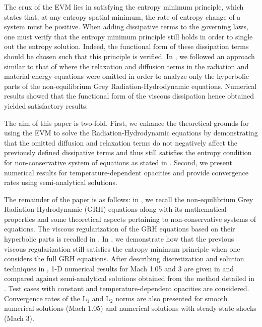 \documentclass[times]{fldauth}
\begin{document}
The crux of the EVM lies in satisfying the entropy minimum principle, which states that, at any entropy spatial 
minimum, the rate of entropy change of a system must be positive. When
adding dissipative terms to the governing laws, one must verify that the entropy minimum principle still holds in 
order to single out the entropy solution. Indeed, the functional form of these dissipation terms
should be chosen such that this principle is verified. In \cite{our_jcp_radhy_paper}, we followed an approach 
similar to that of \cite{Balsara, LowrieMorel} 
where the relaxation and diffusion terms in the radiation and material energy equations were omitted in order to 
analyze only the hyperbolic parts of 
the non-equilibrium Grey Radiation-Hydrodynamic equations. Numerical results showed that the functional form of the 
viscous dissipation hence obtained yielded satisfactory results. 

The aim of this paper is two-fold. First, we enhance the theoretical grounds for using the EVM to solve the 
Radiation-Hydrodynamic equations by demonstrating that the omitted diffusion
and relaxation terms do not negatively affect the previously defined dissipative terms and thus still satisfies the 
entropy condition for non-conservative system of equations as stated in \cite{our_jcp_radhy_paper}. Second, we present numerical
results for temperature-dependent opacities and provide convergence rates using semi-analytical solutions.

The remainder of the paper is as follows: in , we recall
the non-equilibrium Grey Radiation-Hydrodynamic (GRH) equations along with its mathematical properties and some 
theoretical aspects pertaining to non-conservative systems of equations. 
The viscous regularization of the GRH equations based on their hyperbolic parts is recalled in .
In , we demonstrate how that the previous viscous regularization still satisfies the entropy minimum 
principle when one considers the full GRH equations.
After describing discretization and solution techniques in , 1-D numerical results for Mach 1.05 and 
3 are given in  and compared against semi-analytical solutions obtained from the method detailed in \cite{jim_ferguson} . Test cases with 
constant and temperature-dependent opacities are considered. 
Convergence rates of the L$_1$ and L$_2$ norms are also presented for smooth numerical solutions 
(Mach 1.05) and numerical solutions with steady-state shocks (Mach 3).
%
\end{document}
